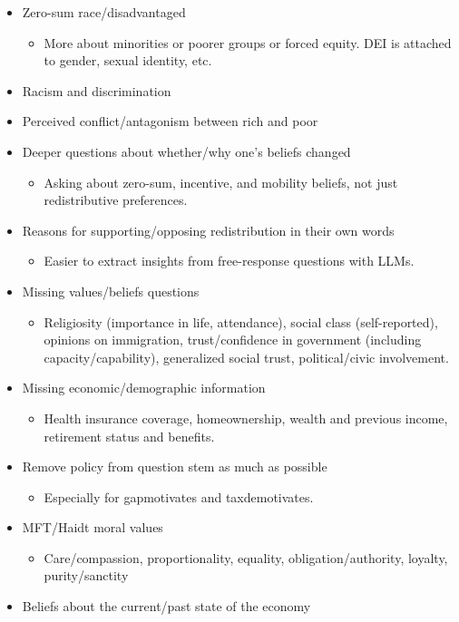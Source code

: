 \documentclass{article}
\begin{document}
\begin{itemize}
\begin{itemize}
    \end{itemize}
    \item Zero-sum race/disadvantaged  
    \begin{itemize}
        \item More about minorities or poorer groups or forced equity. DEI is attached to gender, sexual identity, etc.
    \end{itemize}
    \item Racism and discrimination
    \item Perceived conflict/antagonism between rich and poor
    \item Deeper questions about whether/why one's beliefs changed
    \begin{itemize}
        \item Asking about zero-sum, incentive, and mobility beliefs, not just redistributive preferences.
    \end{itemize}
    \item Reasons for supporting/opposing redistribution in their own words
    \begin{itemize}
        \item Easier to extract insights from free-response questions with LLMs.
    \end{itemize}
    \item Missing values/beliefs questions
    \begin{itemize}
        \item Religiosity (importance in life, attendance), social class (self-reported), opinions on immigration, trust/confidence in government (including capacity/capability), generalized social trust, political/civic involvement.
    \end{itemize}
    \item Missing economic/demographic information
    \begin{itemize}
        \item Health insurance coverage, homeownership, wealth and previous income, retirement status and benefits.
    \end{itemize}
    \item Remove policy from question stem as much as possible
    \begin{itemize}
        \item Especially for gapmotivates and taxdemotivates.
    \end{itemize}
    \item MFT/Haidt moral values
    \begin{itemize}
        \item Care/compassion, proportionality, equality, obligation/authority, loyalty, purity/sanctity
    \end{itemize}
    \item Beliefs about the current/past state of the economy
\end{itemize}
\end{document}
